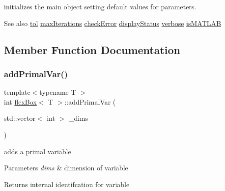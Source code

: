 initializes the main object setting default values for parameters. 

\begin{DoxySeeAlso}{See also}
\hyperlink{classflex_box_acd4f987e22eb761cff9f6c98592808b4}{tol} \hyperlink{classflex_box_aa20a8abc40427d7a4b8c709f1e38318d}{max\+Iterations} \hyperlink{classflex_box_a28507da8c03b9875319a2dd38e28cb4a}{check\+Error} \hyperlink{classflex_box_a0714316abd9498d53328da1f76f2a306}{display\+Status} \hyperlink{classflex_box_aec255fffc4f4356a781be89fee0ed08f}{verbose} \hyperlink{classflex_box_a8d280f8e287a339fc93ae7683b70456d}{is\+M\+A\+T\+L\+AB} 
\end{DoxySeeAlso}


\subsection{Member Function Documentation}
\mbox{\label{classflex_box_a659aac107b85ecf64c9fd1aaa465a98d}} 
\subsubsection{\texorpdfstring{add\+Primal\+Var()}{addPrimalVar()}}
{\footnotesize\ttfamily template$<$typename T $>$ \\
int \hyperlink{classflex_box}{flex\+Box}$<$ T $>$\+::add\+Primal\+Var (\begin{DoxyParamCaption}\item[{std\+::vector$<$ int $>$}]{\+\_\+dims }\end{DoxyParamCaption})\hspace{0.3cm}{\ttfamily [inline]}}



adds a primal variable 


\begin{DoxyParams}{Parameters}
{\em dims} & dimension of variable \\
\hline
\end{DoxyParams}
\begin{DoxyReturn}{Returns}
internal identifcation for variable 
\end{DoxyReturn}
\mbox{\label{classflex_box_a4cba554c506d130824ace967bae82ac3}} 
